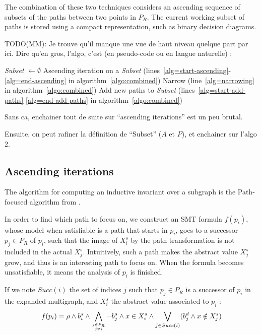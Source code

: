 \documentclass[preprint]{sigplanconf}
\newcommand{\MM}[1]{{\color{blue} TODO(MM): #1}}
\begin{document}
The combination of these two techniques considers an ascending sequence of
subsets of the paths between two points in $P_R$.
The current working subset of paths is stored using a compact representation,
such as binary decision diagrams.

\MM{Je trouve qu'il manque une vue de haut niveau quelque part par
  ici. Dire qu'en gros, l'algo, c'est (en pseudo-code ou en langue naturelle) :

\begin{algorithm}
  \begin{algorithmic}
    \STATE \textit{Subset} $\gets \emptyset$
    \WHILE{true}
    \STATE Ascending iteration on a \textit{Subset} (lines~\ref{alg=start-ascending}-\ref{alg=end-ascending} in algorithm~\ref{algo:combined})
    \STATE Narrow (line~\ref{alg=narrowing} in algorithm~\ref{algo:combined})
    \STATE Add new paths to \textit{Subset} (lines~\ref{alg=start-add-paths}-\ref{alg=end-add-paths} in algorithm~\ref{algo:combined})
    \ENDWHILE
  \end{algorithmic}
\end{algorithm}

Sans ca, enchainer tout de suite sur ``ascending iterations'' est un peu brutal.

Ensuite, on peut rafiner la définition de ``Subset'' ($A$ et $P$), et
enchainer sur l'algo 2.
}

\subsection{Ascending iterations}
\label{subsec:ascending}

The algorithm for computing an inductive invariant over a subgraph is the Path-focused algorithm from \citet{Monniaux_Gonnord_SAS11}.

In order to find which path to focus on, we construct an SMT formula $f(p_i)$, whose
model when satisfiable is a path that starts in $p_i$, goes to a successor $p_j
\in P_R$ of $p_i$, such that the image of $X_{i}^s$ by the path transformation
is not included in the actual $X_{j}^s$.
Intuitively, such a path makes the abstract value $X_{j}^s$ grow, and thus is
an interesting path to focus on. When the formula becomes unsatisfiable, it
means the analysis of $p_i$ is finished.

If we note $Succ(i)$ the set of indices $j$ such that $p_j \in P_R$ is a
successor of $p_i$ in the expanded multigraph, and $X_i^s$ the abstract value
associated to $p_i$ :
$$f(p_i) = \rho \wedge b_i^s \wedge 
\displaystyle\bigwedge_{j \in P_R \atop j \neq i} \neg
b_j^s \wedge x \in X_i^s \wedge \displaystyle\bigvee_{j \in Succ(i)} (b_j^d \wedge
x \notin X_j^s)$$
\end{document}
